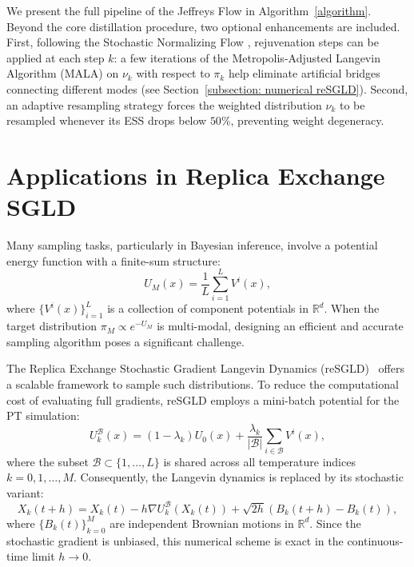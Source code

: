 \documentclass[%
 reprint,
 amsmath,amssymb,
 aps,
 pre,
]{revtex4-2}
\begin{document}
We present the full pipeline of the Jeffreys Flow in Algorithm~\ref{algorithm}. Beyond the core distillation procedure, two optional enhancements are included. First, following the Stochastic Normalizing Flow \cite{wu2020stochastic}, rejuvenation steps can be applied at each step $k$: a few iterations of the Metropolis-Adjusted Langevin Algorithm (MALA) on $\nu_k$ with respect to $\pi_k$ help eliminate artificial bridges connecting different modes (see Section~\ref{subsection: numerical reSGLD}). Second, an adaptive resampling strategy forces the weighted distribution $\nu_k$ to be resampled whenever its ESS drops below $50\%$, preventing weight degeneracy.

\section{Applications in Replica Exchange SGLD}
\label{section: reSGLD}

Many sampling tasks, particularly in Bayesian inference, involve a potential energy function with a finite-sum structure:
\begin{equation}
	U_M(x) = \frac{1}{L} \sum_{i=1}^L V^i(x),
\end{equation}
where $\{V^i(x)\}_{i=1}^L$ is a collection of component potentials in $\mathbb{R}^d$. When the target distribution $\pi_M \propto e^{-U_M}$ is multi-modal, designing an efficient and accurate sampling algorithm poses a significant challenge.

The Replica Exchange Stochastic Gradient Langevin Dynamics (reSGLD)~\cite{deng2020accelerating} offers a scalable framework to sample such distributions. To reduce the computational cost of evaluating full gradients, reSGLD employs a mini-batch potential for the PT simulation:
\begin{equation}
	U_k^{\mathcal B}(x) = (1-\lambda_k) U_0(x) + \frac{\lambda_k}{|\mathcal B|} \sum_{i\in\mathcal B} V^i(x),
\end{equation}
where the subset $\mathcal B \subset \{1,\dots,L\}$ is shared across all temperature indices $k=0,1,\dots,M$. Consequently, the Langevin dynamics is replaced by its stochastic variant:
\begin{equation*}
    X_k(t + h) = X_k(t) - h \nabla U_k^{\mathcal B}(X_k(t)) + \sqrt{2h}(B_k(t + h) - B_k(t)),
\end{equation*}
where $\{B_k(t)\}_{k=0}^M$ are independent Brownian motions in $\mathbb{R}^d$. Since the stochastic gradient is unbiased, this numerical scheme is exact in the continuous-time limit $h \to 0$.
\end{document}
